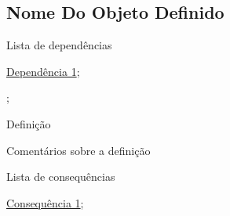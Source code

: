 \subsection{Nome Do Objeto Definido}
\label{nome-do-objeto-def}
\begin{titlemize}{Lista de dependências}
	\item \hyperref[dependecia1]{Dependência 1};\\ %
	\item \hyperref[]{};\\
\end{titlemize}
\begin{def}
	Definição 
\end{def}

Comentários sobre a definição

\begin{titlemize}{Lista de consequências}
	\item \hyperref[consequencia1]{Consequência 1};\\ %
	\item \hyperref[]{}
\end{titlemize}

